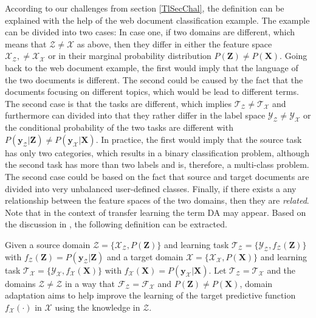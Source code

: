 According to our challenges from section \ref{TlSecChal}, the definition can be explained with the help of the web document classification example.\cite[p. 4]{Weiss.2016}
The example can be divided into two cases:
In case one, if two domains are different, which means that $\mathcal{Z} \neq \mathcal{X}$ as above, then they differ in either the feature space $\mathcal{X_Z}, \neq \mathcal{X_X}$ or in their marginal probability distribution $P(\mathbf{Z}) \neq P(\mathbf{X})$.
Going back to the web document example, the first would imply that the language of the two documents is different.
The second could be caused by the fact that the documents focusing on different topics, which would be lead to different terms.\cite{Pan.2010}\\
The second case is that the tasks are different, which implies $\mathcal{T_Z} \neq \mathcal{T_X}$ and furthermore can divided into that they rather differ in the label space $\mathcal{Y_Z} \neq \mathcal{Y_X}$ or the conditional probability of the two tasks are different with $P(\mathbf{y}_\mathcal{Z}\vert \mathbf{Z}) \neq P(\mathbf{y}_\mathcal{X}\vert \mathbf{X})$.
In practice, the first would imply that the source task has only two categories, which results in a binary classification problem, although the second task has more than two labels and is, therefore, a multi-class problem.
The second case could be based on the fact that source and target documents are divided into very unbalanced user-defined classes.
Finally, if there exists a any relationship between the feature spaces of the two domains, then they are \textit{related}.\cite{Pan.2010}\\
Note that in the context of transfer learning the term \ac{DA} may appear.
Based on the discussion in \cite{Pan.2011}, the following definition can be extracted.
\begin{mDef}\label{DefDa}
	Given a source domain $\mathcal{Z}=\{\mathcal{X}_\mathcal{Z},P(\mathbf{Z})\}$ and learning task $\mathcal{T_Z}=\{\mathcal{Y_Z},f_\mathcal{Z}(\mathbf{Z})\}$ with $f_\mathcal{Z}(\mathbf{Z}) = P(\mathbf{y}_\mathcal{Z}|\mathbf{Z})$ and a target domain $\mathcal{X}=\{\mathcal{X}_\mathcal{X},P(\mathbf{X})\}$ and learning task $\mathcal{T_X}=\{\mathcal{Y_X},f_\mathcal{X}(\mathbf{X})\}$ with $f_\mathcal{X}(\mathbf{X}) = P(\mathbf{y}_\mathcal{X}|\mathbf{X})$. Let $\mathcal{T_Z} = \mathcal{T_X}$ and the domains $\mathcal{Z} \neq \mathcal{Z}$ in a way that $\mathcal{F}_\mathcal{Z} = \mathcal{F}_\mathcal{X}$ and $P(\mathbf{Z}) \neq P(\mathbf{X})$, domain adaptation aims to help improve the learning of the target predictive function $f_\mathcal{X}(\cdot)$ in $\mathcal{X}$ using the knowledge in $\mathcal{Z}$.
\end{mDef}
